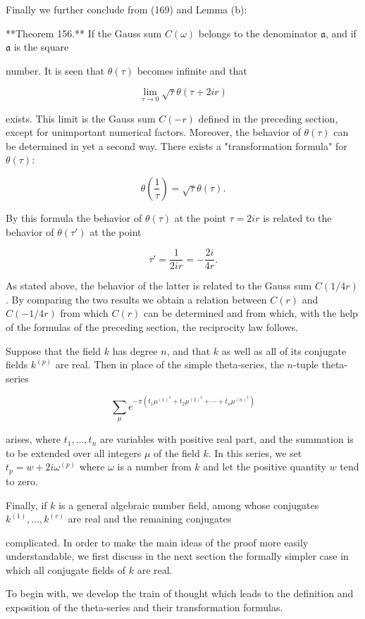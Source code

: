 Finally we further conclude from (169) and Lemma (b):

**Theorem 156.** If the Gauss sum $C(\omega)$ belongs to the denominator $\mathfrak{a}$, and if $\mathfrak{a}$ is the square

number. It is seen that $\theta(\tau)$ becomes infinite and that

$$\lim_{\tau \to 0} \sqrt{\tau} \theta(\tau + 2ir)$$

exists. This limit is the Gauss sum $C(-r)$ defined in the preceding section, except for unimportant numerical factors. Moreover, the behavior of $\theta(\tau)$ can be determined in yet a second way. There exists a "transformation formula" for $\theta(\tau)$:

$$\theta\left(\frac{1}{\tau}\right) = \sqrt{\tau} \theta(\tau).$$

By this formula the behavior of $\theta(\tau)$ at the point $\tau = 2ir$ is related to the behavior of $\theta(\tau')$ at the point

$$\tau' = \frac{1}{2ir} = -\frac{2i}{4r}.$$

As stated above, the behavior of the latter is related to the Gauss sum $C(1/4r)$. By comparing the two results we obtain a relation between $C(r)$ and $C(-1/4r)$ from which $C(r)$ can be determined and from which, with the help of the formulas of the preceding section, the reciprocity law follows.

Suppose that the field $k$ has degree $n$, and that $k$ as well as all of its conjugate fields $k^{(p)}$ are real. Then in place of the simple theta-series, the $n$-tuple theta-series

$$\sum_{\mu} e^{-\pi(t_1\mu^{(1)}^2 + t_2\mu^{(2)}^2 + \cdots + t_n\mu^{(n)}^2)}$$

arises, where $t_1, \ldots, t_n$ are variables with positive real part, and the summation is to be extended over all integers $\mu$ of the field $k$. In this series, we set $t_p = w + 2i\omega^{(p)}$ where $\omega$ is a number from $k$ and let the positive quantity $w$ tend to zero.

Finally, if $k$ is a general algebraic number field, among whose conjugates $k^{(1)}, \ldots, k^{(r)}$ are real and the remaining conjugates

complicated. In order to make the main ideas of the proof more easily understandable, we first discuss in the next section the formally simpler case in which all conjugate fields of $k$ are real.

To begin with, we develop the train of thought which leads to the definition and exposition of the theta-series and their transformation formulas.

